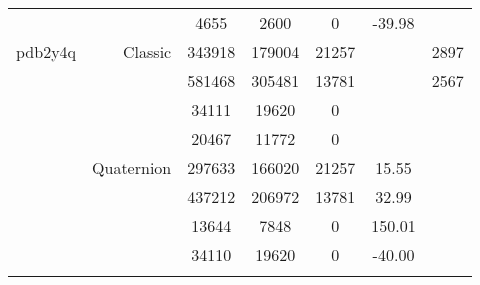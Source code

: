 \begin{xltabular}{\textwidth}{r|rcccSc}
& & 4655 & 2600 & 0 & -39.98 & \\ \addlinespace
pdb2y4q & Classic & 343918 & 179004 & 21257 & & 2897 \\
& & 581468 & 305481 & 13781 & & 2567 \\
& & 34111 & 19620 & 0 & & \\
& & 20467 & 11772 & 0 & & \\
& Quaternion & 297633 & 166020 & 21257 & 15.55 & \\
& & 437212 & 206972 & 13781 & 32.99 & \\
& & 13644 & 7848 & 0 & 150.01 & \\
& & 34110 & 19620 & 0 & -40.00 & \\ \addlinespace
\end{xltabular}
